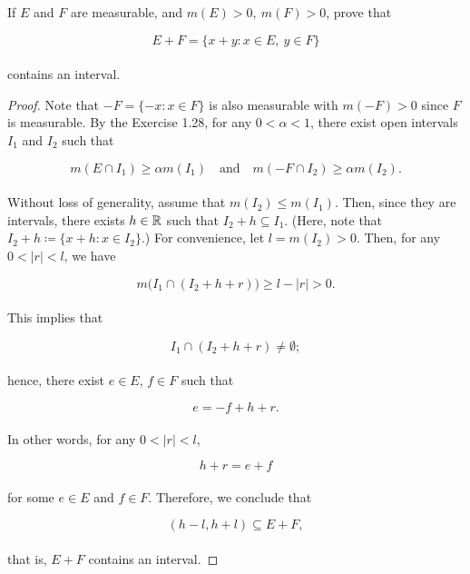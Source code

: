 \documentclass[12pt, a4paper, openany, twoside]{book}
\theoremstyle{definition}
\theoremstyle{remark}
\theoremstyle{plain}
\numberwithin{equation}{section}
\begin{document}
\begin{tcolorbox}[colback=yellow!10!white,colframe=gray!75!black,title=Exercise 1.30]\label{Exercise 1.30}
    If $E$ and $F$ are measurable, and $m(E)>0,\ m(F)>0$, prove that 

    \[E+F=\{x+y:x\in E,\ y\in F\}\]
    \\
    contains an interval.
\end{tcolorbox}
\begin{proof}
    Note that $-F=\{-x:x\in F\}$ is also measurable with $m(-F)>0$ since $F$ is measurable. By the Exercise 1.28, for any $0<\alpha<1$, there exist open intervals $I_1$ and $I_2$ such that 

    \[m(E\cap I_1)\geq\alpha m(I_1)\quad\text{and}\quad m(-F\cap I_2)\geq\alpha m(I_2).\]
    \\
    Without loss of generality, assume that $m(I_2)\leq m(I_1)$. Then, since they are intervals, there exists $h\in{\mathbb {R}}$ such that $I_2+h\subseteq I_1$. (Here, note that $I_2+h\coloneqq\{x+h:x\in I_2\}$.) For convenience, let $l=m(I_2)>0$. Then, for any $0<|r|<l$, we have 

    \[m\big(I_1\cap (I_2+h+r)\big)\geq l-|r|>0.\]
    \\
    This implies that 

    \[I_1\cap (I_2+h+r)\neq\emptyset;\]
    \\
    hence, there exist $e\in E$, $f\in F$ such that 

    \[e=-f+h+r.\]
    \\
    In other words, for any $0<|r|<l$, 

    \[h+r=e+f\]
    \\
    for some $e\in E$ and $f\in F$. Therefore, we conclude that
    
    \[(h-l,h+l)\subseteq E+F,\]
    \\
    that is, $E+F$ contains an interval.
\end{proof}

\newpage
\end{document}
